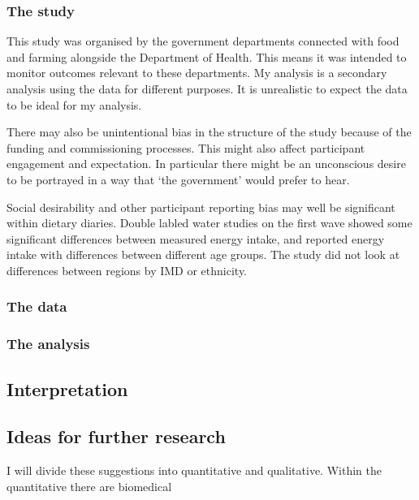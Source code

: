 \documentclass[
]{article}
\begin{document}
\hypertarget{the-study}{%
\subsubsection{The study}\label{the-study}}

This study was organised by the government departments connected with
food and farming alongside the Department of Health. This means it was
intended to monitor outcomes relevant to these departments. My analysis
is a secondary analysis using the data for different purposes. It is
unrealistic to expect the data to be ideal for my analysis.

There may also be unintentional bias in the structure of the study
because of the funding and commissioning processes. This might also
affect participant engagement and expectation. In particular there might
be an unconscious desire to be portrayed in a way that `the government'
would prefer to hear.

Social desirability and other participant reporting bias may well be
significant within dietary diaries. Double labled water studies on the
first wave showed some significant differences between measured energy
intake, and reported energy intake with differences between different
age groups. The study did not look at differences between regions by IMD
or ethnicity.

\hypertarget{the-data}{%
\subsubsection{The data}\label{the-data}}

\hypertarget{the-analysis}{%
\subsubsection{The analysis}\label{the-analysis}}

\hypertarget{interpretation}{%
\subsection{Interpretation}\label{interpretation}}

\hypertarget{ideas-for-further-research}{%
\subsection{Ideas for further
research}\label{ideas-for-further-research}}

I will divide these suggestions into quantitative and qualitative.
Within the quantitative there are biomedical
\end{document}
